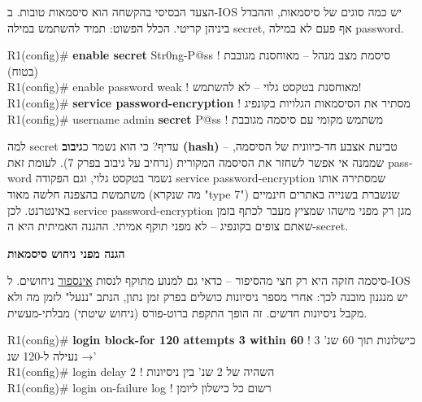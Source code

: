 \documentclass[11pt]{article}
\newcommand{\enLR}[1]{\textenglish{#1}}
\newcommand{\code}[1]{\textenglish{\codefont #1}}
\newcommand{\sectionheading}[1]{\vskip10pt\penalty-200{\large\bfseries\color{h2}#1\par}\vskip3pt}
\newcommand{\subheading}[1]{\vskip6pt{\bfseries\color{h3}#1\par}\vskip2pt}
\begin{document}
\sectionheading{\enLR{2.3} סיסמאות: מה חזק, מה חלש, ולמה}

הצעד הבסיסי בהקשחה הוא סיסמאות טובות. ב-\enLR{IOS} יש כמה סוגים של סיסמאות, וההבדל ביניהן קריטי. הכלל הפשוט: תמיד להשתמש במילה \code{secret}, אף פעם לא במילה \code{password}.\par

\begin{codebox}\begin{english}\codefont\footnotesize\color{cfg}\setlength{\parindent}{0pt}
R1(config)\# \textcolor{cbold}{\textbf{enable secret}} Str0ng-P@ss   \textcolor{ccom}{\texthebrew{! סיסמת מצב מנהל – מאוחסנת מגובבת (בטוח)}}\\
R1(config)\# enable password weak         \textcolor{ccom}{\texthebrew{! מאוחסנת בטקסט גלוי – לא להשתמש!}}\\
R1(config)\# \textcolor{cbold}{\textbf{service password-encryption}}  \textcolor{ccom}{\texthebrew{! מסתיר את הסיסמאות הגלויות בקונפיג}}\\
R1(config)\# username admin \textcolor{cbold}{\textbf{secret}} P@ss   \textcolor{ccom}{\texthebrew{! משתמש מקומי עם סיסמה מגובבת}}
\end{english}\end{codebox}

למה \code{secret} עדיף? כי הוא נשמר כ\textbf{גיבוב \enLR{(hash)}} – טביעת אצבע חד-כיוונית של הסיסמה, שממנה אי אפשר לשחזר את הסיסמה המקורית (נרחיב על גיבוב בפרק \enLR{7).} לעומת זאת \code{password} נשמר בטקסט גלוי, וגם הפקודה \code{service password-encryption} שמסתירה אותו משתמשת בהצפנה חלשה מאוד (מה שנקרא "\enLR{type 7")} שנשברת בשנייה באתרים חינמיים באינטרנט. לכן \code{service password-encryption} מגן רק מפני מישהו שמציץ מעבר לכתף בזמן שאתם צופים בקונפיג – לא מפני תוקף אמיתי. ההגנה האמיתית היא ה-\code{secret}.\par

\subheading{הגנה מפני ניחוש סיסמאות}

סיסמה חזקה היא רק חצי מהסיפור – כדאי גם למנוע מתוקף לנסות \underline{אינספור} ניחושים. ל-\enLR{IOS} יש מנגנון מובנה לכך: אחרי מספר ניסיונות כושלים בפרק זמן נתון, הנתב "ננעל" לזמן מה ולא מקבל ניסיונות חדשים. זה הופך התקפת ברוט-פורס (ניחוש שיטתי) מבלתי-מעשית.\par

\begin{codebox}\begin{english}\codefont\footnotesize\color{cfg}\setlength{\parindent}{0pt}
R1(config)\# \textcolor{cbold}{\textbf{login block-for 120 attempts 3 within 60}}  \textcolor{ccom}{\texthebrew{! \enLR{3} כישלונות תוך \enLR{60} שנ' → נעילה ל-\enLR{120} שנ'}}\\
R1(config)\# login delay 2                              \textcolor{ccom}{\texthebrew{! השהיה של \enLR{2} שנ' בין ניסיונות}}\\
R1(config)\# login on-failure log                       \textcolor{ccom}{\texthebrew{! רשום כל כישלון ליומן}}
\end{english}\end{codebox}
\end{document}
